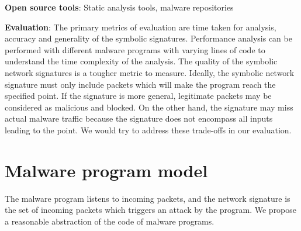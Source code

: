 \documentclass[]{article}
\begin{document}
\noindent\textbf{Open source tools}: Static analysis tools, malware repositories

\noindent\textbf{Evaluation}: 
The primary metrics of evaluation are time taken for analysis, accuracy and 
generality of the symbolic signatures. Performance analysis can be performed 
with different malware programs with varying lines of code to understand
the time complexity of the analysis. The quality of the symbolic network
signatures is a tougher metric to measure. Ideally, the symbolic network 
signature must only include packets which will make the program reach the
specified point. If the signature is more general, legitimate packets may 
be considered as malicious and blocked. On the other hand, the signature
may miss actual malware traffic because the signature does not encompass
all inputs leading to the point. We would try to address these trade-offs in
our evaluation.

\appendix
\section{Malware program model}
The malware program listens to incoming packets, and the
network signature is the set of incoming packets which triggers
an attack by the program. We propose a reasonable abstraction
of the code of malware programs. 
\end{document}
